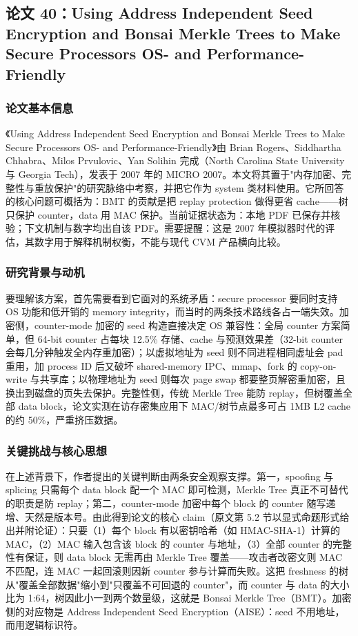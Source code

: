 \documentclass[11pt]{ctexart}
\begin{document}
\subsection{论文 40：Using Address Independent Seed Encryption and Bonsai Merkle Trees to Make Secure Processors OS- and Performance-Friendly}
\subsubsection{论文基本信息}
《Using Address Independent Seed Encryption and Bonsai Merkle Trees to Make Secure Processors OS- and Performance-Friendly》由 Brian Rogers、Siddhartha Chhabra、Milos Prvulovic、Yan Solihin 完成（North Carolina State University 与 Georgia Tech），发表于 2007 年的 MICRO 2007。本文将其置于"内存加密、完整性与重放保护"的研究脉络中考察，并把它作为 system 类材料使用。它所回答的核心问题可概括为：BMT 的贡献是把 replay protection 做得更省 cache——树只保护 counter，data 用 MAC 保护。当前证据状态为：本地 PDF 已保存并核验；下文机制与数字均出自该 PDF。需要提醒：这是 2007 年模拟器时代的评估，其数字用于解释机制权衡，不能与现代 CVM 产品横向比较。\cite{rogers2007bonsai}\par
\subsubsection{研究背景与动机}
要理解该方案，首先需要看到它面对的系统矛盾：secure processor 要同时支持 OS 功能和低开销的 memory integrity，而当时的两条技术路线各占一端失效。加密侧，counter-mode 加密的 seed 构造直接决定 OS 兼容性：全局 counter 方案简单，但 64-bit counter 占每块 12.5\% 存储、cache 与预测效果差（32-bit counter 会每几分钟触发全内存重加密）；以虚拟地址为 seed 则不同进程相同虚址会 pad 重用，加 process ID 后又破坏 shared-memory IPC、mmap、fork 的 copy-on-write 与共享库；以物理地址为 seed 则每次 page swap 都要整页解密重加密，且换出到磁盘的页失去保护。完整性侧，传统 Merkle Tree 能防 replay，但树覆盖全部 data block，论文实测在访存密集应用下 MAC/树节点最多可占 1MB L2 cache 的约 50\%，严重挤压数据。\par
\subsubsection{关键挑战与核心思想}
在上述背景下，作者提出的关键判断由两条安全观察支撑。第一，spoofing 与 splicing 只需每个 data block 配一个 MAC 即可检测，Merkle Tree 真正不可替代的职责是防 replay；第二，counter-mode 加密中每个 block 的 counter 随写递增、天然是版本号。由此得到论文的核心 claim（原文第 5.2 节以显式命题形式给出并附论证）：只要（1）每个 block 有以密钥哈希（如 HMAC-SHA-1）计算的 MAC，（2）MAC 输入包含该 block 的 counter 与地址，（3）全部 counter 的完整性有保证，则 data block 无需再由 Merkle Tree 覆盖——攻击者改密文则 MAC 不匹配，连 MAC 一起回滚则因新 counter 参与计算而失败。这把 freshness 的树从"覆盖全部数据"缩小到"只覆盖不可回退的 counter"，而 counter 与 data 的大小比为 1:64，树因此小一到两个数量级，这就是 Bonsai Merkle Tree（BMT）。加密侧的对应物是 Address Independent Seed Encryption（AISE）：seed 不用地址，而用逻辑标识符。\par
\end{document}
